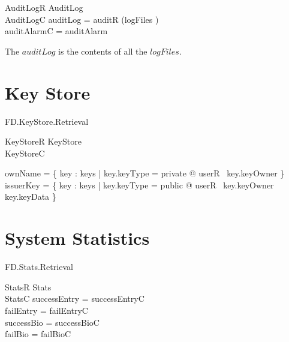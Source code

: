 \begin{schema}{AuditLogR}
        AuditLog
\\      AuditLogC
\where
        auditLog = auditR \limg \bigcup (\ran logFiles ) \rimg
\\
        auditAlarmC = auditAlarm
\end{schema}
\begin{Zcomment}
\item
The $auditLog$ is the contents of all the $logFiles$.
\end{Zcomment}



\section{Key Store}

\begin{traceunit}{FD.KeyStore.Retrieval}
\end{traceunit}

\begin{schema}{KeyStoreR}
        KeyStore
\\      KeyStoreC
\where

        ownName = \{ key : keys | key.keyType = private @ userR~ key.keyOwner
        \}
\\      issuerKey = \{ key : keys | key.keyType = public @
        userR~ key.keyOwner \mapsto key.keyData \}
\end{schema}



\section{System Statistics}

\begin{traceunit}{FD.Stats.Retrieval}
\end{traceunit}

\begin{schema}{StatsR}
        Stats
\\      StatsC
\where 
        successEntry = successEntryC 
\\      failEntry = failEntryC 
\\      successBio = successBioC 
\\      failBio = failBioC 
\end{schema}

